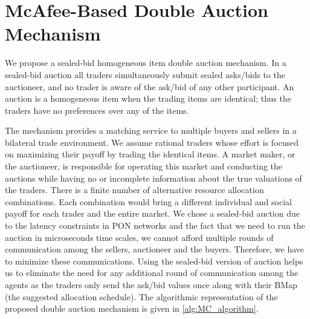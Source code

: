 \section{McAfee-Based Double Auction Mechanism}
\label{sec:auction_mechanism}
We propose a sealed-bid homogeneous item double auction mechanism. In a sealed-bid auction all traders simultaneously submit sealed asks/bids to the auctioneer, and no trader is aware of the ask/bid of any other participant. An auction is a homogeneous item when the trading items are identical; thus the traders have no preferences over any of the items.


The mechanism provides a matching service to multiple buyers and sellers in a bilateral trade environment. We assume rational traders whose effort is focused on maximizing their payoff by trading the identical items. A market maker, or the auctioneer, is responsible for operating this market and conducting the auctions while having no or incomplete information about the true valuations of the traders. There is a finite number of alternative resource allocation combinations. Each combination would bring a different individual and social payoff for each trader and the entire market.
We chose a sealed-bid auction due to the latency constraints in \ac{PON} networks and the fact that we need to run the auction in microseconds time scales, we cannot afford multiple rounds of communication among the sellers, auctioneer and the buyers. Therefore, we have to minimize these communications. Using the sealed-bid version of auction helps us to eliminate the need for any additional round of communication among the agents as the traders only send the ask/bid values once along with their \ac{BMap} (the suggested allocation schedule). The algorithmic representation of the proposed double auction mechanism is given in \autoref{alg:MC_algorithm}.

